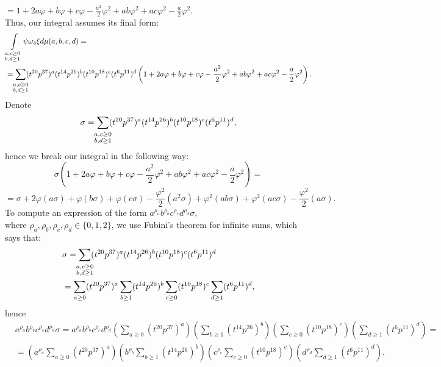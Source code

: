\documentclass{article}
\begin{document}
$=1+2a\varphi+b\varphi+c\varphi-\frac{a^2}{2}\varphi^2+ab\varphi^2+ac\varphi^2-\frac{a}{2}\varphi^2$.\\
Thus, our integral assumes its final form:
\begin{align*}
&\int\limits_{\substack{a,c\geq0 \\ b,d\geq1}}\psi\omega_4\xi{d}\mu(a,b,c,d)= \\
&=\sum_{\overset{\mathclap{\scriptstyle a,c\geq{0}}}{\mathclap{\scriptstyle b,d\geq{1}}}}(t^{20}p^{37})^a(t^{14}p^{26})^b(t^{10}p^{18})^c(t^{6}p^{11})^d\left(1+2a\varphi+b\varphi+c\varphi-\frac{a^2}{2}\varphi^2+ab\varphi^2+ac\varphi^2-\frac{a}{2}\varphi^2\right).
\end{align*}
Denote 
\[\sigma=\sum_{\overset{\mathclap{\scriptstyle a,c\geq{0}}}{\mathclap{\scriptstyle b,d\geq{1}}}}(t^{20}p^{37})^a(t^{14}p^{26})^b(t^{10}p^{18})^c(t^{6}p^{11})^d,\]
hence we break our integral in the following way:
\[\sigma\left(1+2a\varphi+b\varphi+c\varphi-\frac{a^2}{2}\varphi^2+ab\varphi^2+ac\varphi^2-\frac{a}{2}\varphi^2\right)=\]\[=\sigma+2\varphi(a\sigma)+\varphi(b\sigma)+\varphi(c\sigma)-\frac{\varphi^2}{2}(a^2\sigma)+\varphi^2(ab\sigma)+\varphi^2(ac\sigma)-\frac{\varphi^2}{2}(a\sigma).
\]
To compute an expression of the form $a^{\rho_a}b^{\rho_b}c^{\rho_c}d^{\rho_d}\sigma$,\\
where $\rho_a,\rho_b,\rho_c,\rho_d\in\{0,1,2\}$, we use Fubini's theorem for infinite sums, which says that:
\begin{align*}
&\sigma=\sum_{\overset{\mathclap{\scriptstyle a,c\geq{0}}}{\mathclap{\scriptstyle b,d\geq{1}}}}(t^{20}p^{37})^a(t^{14}p^{26})^b(t^{10}p^{18})^c(t^{6}p^{11})^d\\
&=\sum_{a\geq{0}}(t^{20}p^{37})^a\sum_{b\geq{1}}(t^{14}p^{26})^b\sum_{c\geq{0}}(t^{10}p^{18})^c\sum_{d\geq{1}}(t^{6}p^{11})^d,\\
\end{align*}
hence
\begin{align*}
&a^{\rho_a}b^{\rho_b}c^{\rho_c}d^{\rho_d}\sigma=a^{\rho_a}b^{\rho_b}c^{\rho_c}d^{\rho_d}\left(\sum_{a\geq{0}}(t^{20}p^{37})^a\right)\left(\sum_{b\geq{1}}(t^{14}p^{26})^b\right)\left(\sum_{c\geq{0}}(t^{10}p^{18})^c\right)\left(\sum_{d\geq{1}}(t^{6}p^{11})^d\right)=\\
&=\left(a^{\rho_a}\sum_{a\geq{0}}(t^{20}p^{37})^a\right)\left(b^{\rho_b}\sum_{b\geq{1}}(t^{14}p^{26})^b\right)\left(c^{\rho_c}\sum_{c\geq{0}}(t^{10}p^{18})^c\right)\left(d^{\rho_d}\sum_{d\geq{1}}(t^{6}p^{11})^d\right).\\
\end{align*}
\end{document}
